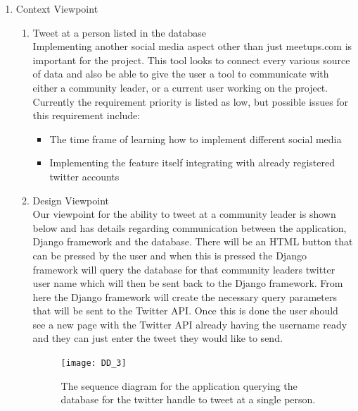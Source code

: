 \documentclass[draftclsnofoot,10pt,onecolumn]{IEEEtran} %
\begin{document}
\begin{enumerate}
		\item Context Viewpoint \\
			\begin{enumerate}
				\item Tweet at a person listed in the database \\
				Implementing another social media aspect other than just meetups.com is important for the project. This
				tool looks to connect every various source of data and also be able to give the user a tool to communicate
				with either a community leader, or a current user working on the project. Currently the requirement priority
				is listed as low, but possible issues for this requirement include:
				\begin{itemize}
					\item The time frame of learning how to implement different social media
					\item Implementing the feature itself integrating with already registered twitter accounts \\
				\end{itemize}
				
				\item Design Viewpoint \\%
				Our viewpoint for the ability to tweet at a community leader is shown below and has details regarding
				communication between the application, Django framework and the database. There will be an HTML
				button that can be pressed by the user and when this is pressed the Django framework will query the
				database for that community leaders twitter user name which will then be sent back to the Django
				framework. From here the Django framework will create the necessary query parameters that will be sent to
				the Twitter API. Once this is done the user should see a new page with the Twitter API already having the
				username ready and they can just enter the tweet they would like to send. \\
				
				\begin{figure}[H]
  					\begin{center}
						\texttt{[image: DD\_3]}
						\captionsetup{width=.4\linewidth}
						\centering
  						\caption{The sequence diagram for the application querying the database for the twitter handle to 
  						tweet at a single person.}
  					\end{center}
				\end{figure}
				

\end{enumerate}
\end{enumerate}
\end{document}
